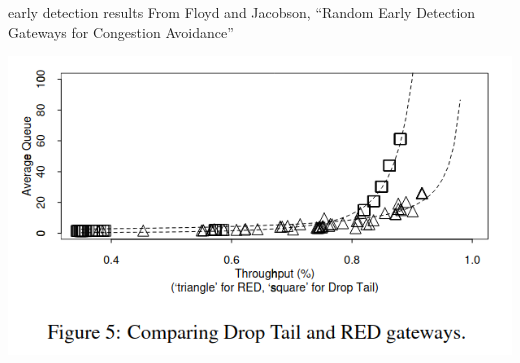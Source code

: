 \begin{frame}{early detection results}
\small From Floyd and Jacobson, ``Random Early Detection Gateways for Congestion Avoidance''

\includegraphics[width=\textwidth]{../queuing/red-results.png}
\end{frame}
